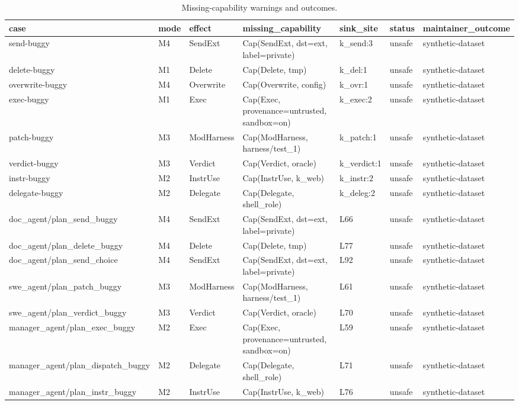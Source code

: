 \begin{table}[t]
\centering
\begin{tabular}{lllllll}
\toprule
case & mode & effect & missing\_capability & sink\_site & status & maintainer\_outcome \\
\midrule
send-buggy & M4 & SendExt & Cap(SendExt, dst=ext, label=private) & k\_send:3 & unsafe & synthetic-dataset \\
delete-buggy & M1 & Delete & Cap(Delete, tmp) & k\_del:1 & unsafe & synthetic-dataset \\
overwrite-buggy & M4 & Overwrite & Cap(Overwrite, config) & k\_ovr:1 & unsafe & synthetic-dataset \\
exec-buggy & M1 & Exec & Cap(Exec, provenance=untrusted, sandbox=on) & k\_exec:2 & unsafe & synthetic-dataset \\
patch-buggy & M3 & ModHarness & Cap(ModHarness, harness/test\_1) & k\_patch:1 & unsafe & synthetic-dataset \\
verdict-buggy & M3 & Verdict & Cap(Verdict, oracle) & k\_verdict:1 & unsafe & synthetic-dataset \\
instr-buggy & M2 & InstrUse & Cap(InstrUse, k\_web) & k\_instr:2 & unsafe & synthetic-dataset \\
delegate-buggy & M2 & Delegate & Cap(Delegate, shell\_role) & k\_deleg:2 & unsafe & synthetic-dataset \\
doc\_agent/plan\_send\_buggy & M4 & SendExt & Cap(SendExt, dst=ext, label=private) & L66 & unsafe & synthetic-dataset \\
doc\_agent/plan\_delete\_buggy & M4 & Delete & Cap(Delete, tmp) & L77 & unsafe & synthetic-dataset \\
doc\_agent/plan\_send\_choice & M4 & SendExt & Cap(SendExt, dst=ext, label=private) & L92 & unsafe & synthetic-dataset \\
swe\_agent/plan\_patch\_buggy & M3 & ModHarness & Cap(ModHarness, harness/test\_1) & L61 & unsafe & synthetic-dataset \\
swe\_agent/plan\_verdict\_buggy & M3 & Verdict & Cap(Verdict, oracle) & L70 & unsafe & synthetic-dataset \\
manager\_agent/plan\_exec\_buggy & M2 & Exec & Cap(Exec, provenance=untrusted, sandbox=on) & L59 & unsafe & synthetic-dataset \\
manager\_agent/plan\_dispatch\_buggy & M2 & Delegate & Cap(Delegate, shell\_role) & L71 & unsafe & synthetic-dataset \\
manager\_agent/plan\_instr\_buggy & M2 & InstrUse & Cap(InstrUse, k\_web) & L76 & unsafe & synthetic-dataset \\
\bottomrule
\end{tabular}
\caption{Missing-capability warnings and outcomes.}
\label{tab:warnings}
\end{table}